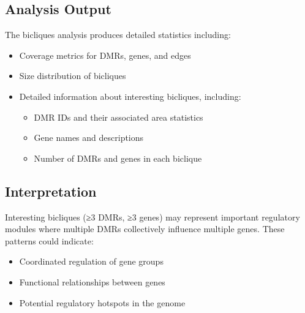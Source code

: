 \documentclass{article}
\begin{document}
\subsection{Analysis Output}
The bicliques analysis produces detailed statistics including:
\begin{itemize}
    \item Coverage metrics for DMRs, genes, and edges
    \item Size distribution of bicliques
    \item Detailed information about interesting bicliques, including:
    \begin{itemize}
        \item DMR IDs and their associated area statistics
        \item Gene names and descriptions
        \item Number of DMRs and genes in each biclique
    \end{itemize}
\end{itemize}

\subsection{Interpretation}
Interesting bicliques (≥3 DMRs, ≥3 genes) may represent important regulatory modules where multiple DMRs collectively influence multiple genes. These patterns could indicate:
\begin{itemize}
    \item Coordinated regulation of gene groups
    \item Functional relationships between genes
    \item Potential regulatory hotspots in the genome
\end{itemize}
\end{document}

